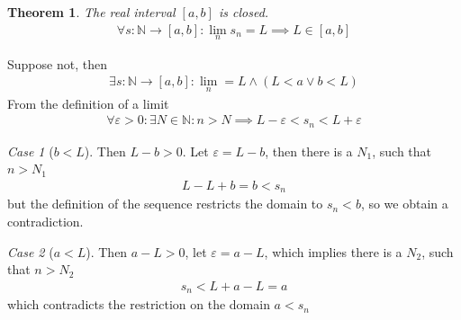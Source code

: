 \documentclass{amsart}
\numberwithin{equation}{section}
\let\oldendproof\endproof
\renewenvironment{proof}[1][\proofname]{%
  \setcounter{case}{0}
  \setcounter{step}{0}
  \oldproof[#1]%
}{\oldendproof}
\theoremstyle{plain}
\newtheorem{theorem}{Theorem}[section]
\theoremstyle{definition}
\theoremstyle{remark}
\newtheorem{case}{Case}
\begin{document}
%
%

\begin{theorem}
  The real interval $[a,b]$ is closed.
  \begin{align}
    \forall s: \mathbb{N} \to [a,b]: \lim_n s_n = L \implies L \in [a,b]
  \end{align}
\end{theorem}
\begin{proof}
  Suppose not, then
  \begin{align}
    \exists s: \mathbb{N} \to [a,b]: \lim_n = L \land (L<a \lor b< L)
  \end{align}
  From the definition of a limit
  \begin{align}
    \forall \varepsilon > 0 : \exists N\in \mathbb{N}: n>N \implies L - \varepsilon < s_n < L + \varepsilon
  \end{align}
  \begin{case}[$b<L$]
    Then $L-b>0$. Let $\varepsilon = L -b$, then there is a $N_1$, such that $n>N_1$
    \begin{align}
      L - L + b = b < s_n
    \end{align}
    but the definition of the sequence restricts the domain to $s_n< b$, so we obtain a contradiction.
  \end{case}
  \begin{case}[$a<L$]
    Then $a-L>0$, let $\varepsilon = a-L$, which implies there is a $N_2$, such that $n>N_2$
    \begin{align}
      s_n < L + a - L = a
    \end{align}
    which contradicts the restriction on the domain $a<s_n$
  \end{case}
\end{proof}
\end{document}
